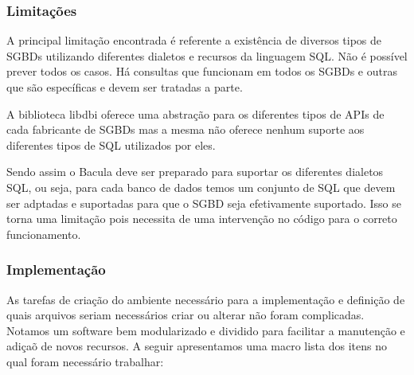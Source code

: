 \subsubsection{Limitações}

A principal limitação encontrada é referente a existência de diversos tipos de SGBDs utilizando diferentes dialetos e recursos da linguagem SQL. Não é possível prever todos os casos. Há consultas que funcionam em todos os SGBDs e outras que são específicas e devem ser tratadas a parte. 

A biblioteca libdbi oferece uma abstração para os diferentes tipos de APIs de cada fabricante de SGBDs mas a mesma não oferece nenhum suporte aos diferentes tipos de SQL utilizados por eles.

Sendo assim o Bacula deve ser preparado para suportar os diferentes dialetos SQL, ou seja, para cada banco de dados temos um conjunto de SQL que devem ser adptadas e suportadas para que o SGBD seja efetivamente suportado. Isso se torna uma limitação pois necessita de uma intervenção no código para o correto funcionamento.

\subsubsection{Implementação}

As tarefas de criação do ambiente necessário para a implementação e definição de quais arquivos seriam necessários criar ou alterar não foram complicadas. Notamos um software bem modularizado e dividido para facilitar a manutenção e adiçaõ de novos recursos. A seguir apresentamos uma macro lista dos itens no qual foram necessário trabalhar:


